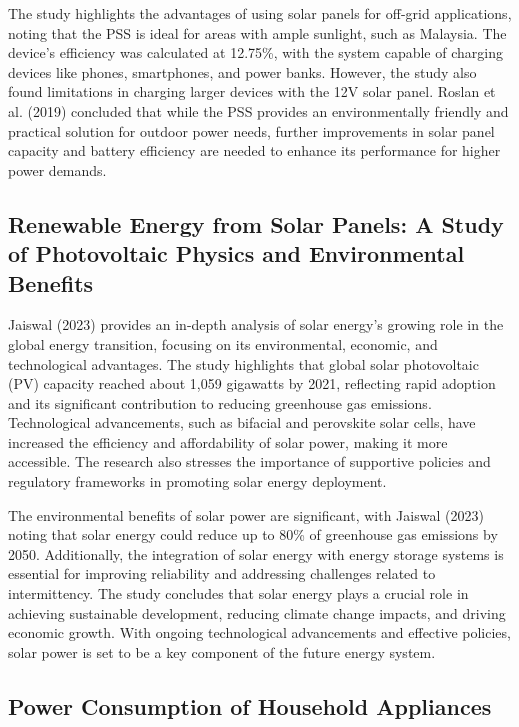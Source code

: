 {The study highlights the advantages of using solar panels for off-grid applications, noting that the PSS is ideal for areas with ample sunlight, such as Malaysia. The device’s efficiency was calculated at 12.75\%, with the system capable of charging devices like phones, smartphones, and power banks. However, the study also found limitations in charging larger devices with the 12V solar panel. Roslan et al. (2019) concluded that while the PSS provides an environmentally friendly and practical solution for outdoor power needs, further improvements in solar panel capacity and battery efficiency are needed to enhance its performance for higher power demands.

\subsection{Renewable Energy from Solar Panels: A Study of  Photovoltaic Physics and Environmental Benefits}

Jaiswal (2023) provides an in-depth analysis of solar energy’s growing role in the global energy transition, focusing on its environmental, economic, and technological advantages. The study highlights that global solar photovoltaic (PV) capacity reached about 1,059 gigawatts by 2021, reflecting rapid adoption and its significant contribution to reducing greenhouse gas emissions. Technological advancements, such as bifacial and perovskite solar cells, have increased the efficiency and affordability of solar power, making it more accessible. The research also stresses the importance of supportive policies and regulatory frameworks in promoting solar energy deployment.

The environmental benefits of solar power are significant, with Jaiswal (2023) noting that solar energy could reduce up to 80\% of greenhouse gas emissions by 2050. Additionally, the integration of solar energy with energy storage systems is essential for improving reliability and addressing challenges related to intermittency. The study concludes that solar energy plays a crucial role in achieving sustainable development, reducing climate change impacts, and driving economic growth. With ongoing technological advancements and effective policies, solar power is set to be a key component of the future energy system.

\subsection{Power Consumption of Household Appliances }

}
